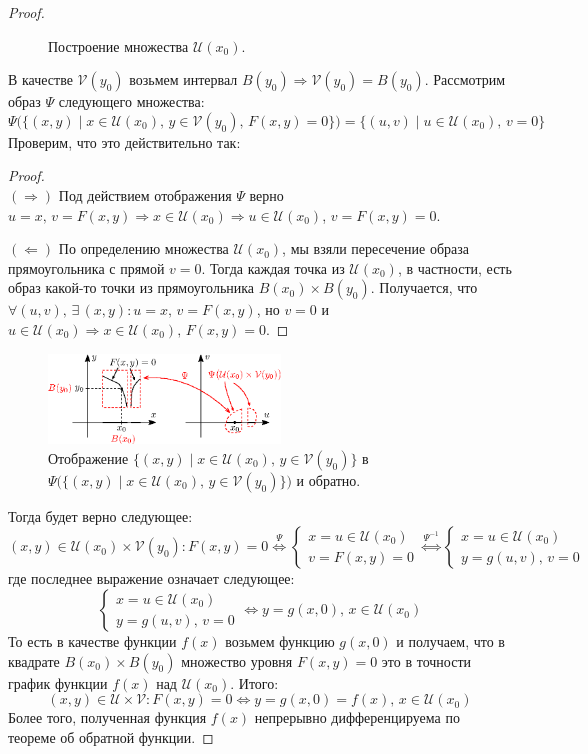 \documentclass[12pt]{article}
\newcommand{\MU}{\mathcal{U}}
\newcommand{\MV}{\mathcal{V}}
\theoremstyle{definition}
\begin{document}
\begin{proof}
\begin{figure}[H]
		\caption{Построение множества $\MU(x_0)$.}
		\label{16_5}
	\end{figure}
	В качестве $\MV(y_0)$ возьмем интервал $B(y_0) \Rightarrow \MV(y_0) = B(y_0)$. Рассмотрим образ $\Psi$ следующего множества:
	$$
		\Psi\big(\{(x,y) \mid x \in \MU(x_0), \, y \in \MV(y_0), \, F(x,y) = 0 \}\big) = \{(u,v) \mid u \in \MU(x_0), \, v = 0 \}
	$$
	Проверим, что это действительно так:
	\begin{proof}\hfill\\
		$(\Rightarrow)$ Под действием отображения $\Psi$ верно $u =x, \, v = F(x,y) \Rightarrow x \in \MU(x_0) \Rightarrow u \in \MU(x_0)$, $v = F(x,y) = 0$.
		
		$(\Leftarrow)$ По определению множества $\MU(x_0)$, мы взяли пересечение образа прямоугольника с прямой $v = 0$. Тогда каждая точка из $\MU(x_0)$, в частности, есть образ какой-то точки из прямоугольника $B(x_0) \times B(y_0)$. Получается, что $\forall (u,v), \, \exists \, (x,y) \colon u = x, \, v = F(x,y)$, но $v = 0$ и $u \in \MU(x_0) \Rightarrow x \in \MU(x_0), \, F(x,y) = 0$.
	\end{proof}
	\begin{figure}[H]
		\centering
		\includegraphics[width=0.55\textwidth]{16_6.eps}
		\caption{Отображение $\{(x,y) \mid x \in \MU(x_0), \, y \in \MV(y_0)\}$ в $\Psi\big(\{(x,y) \mid x \in \MU(x_0), \, y \in \MV(y_0)\}\big)$ и обратно.}
		\label{16_6}
	\end{figure}
	Тогда будет верно следующее:
	$$
		(x,y) \in \MU(x_0) \times \MV(y_0) \colon F(x,y) = 0 \overset{\Psi}{\Leftrightarrow}
		\left\{\begin{array}{l}
			x = u \in \MU(x_0) \\
			v = F(x,y) = 0
		\end{array}\right. 
	 	\overset{\Psi^{-1}}{\Leftrightarrow}
		\left\{\begin{array}{l}
	 		x = u \in \MU(x_0) \\
	 		y = g(u,v), \, v = 0
	 	\end{array}\right. 
	$$
	где последнее выражение означает следующее:
	$$
		\left\{\begin{array}{l}
			x = u \in \MU(x_0) \\
			y = g(u,v), \, v = 0
		\end{array}\right. 
		\Leftrightarrow y = g(x,0), \, x \in \MU(x_0)
	$$
	То есть в качестве функции $f(x)$ возьмем функцию $g(x,0)$ и получаем, что в квадрате $B(x_0)\times B(y_0)$ множество уровня $F(x,y) = 0$ это в точности график функции $f(x)$ над $\MU(x_0)$. Итого:
	$$
		(x,y) \in \MU \times \MV \colon F(x,y) = 0 \Leftrightarrow y = g(x,0) = f(x), \, x \in \MU(x_0)
	$$
	Более того, полученная функция $f(x)$ непрерывно дифференцируема по теореме об обратной функции.
\end{proof}
\end{document}
